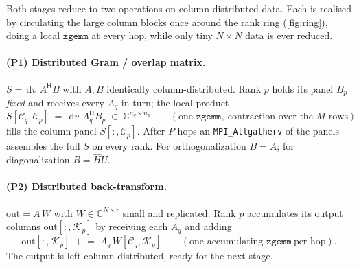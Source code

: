 \documentclass[11pt]{article}
\newcommand{\dv}{\,\mathrm{d}v\,}
\newcommand{\Herm}{^{\mathsf{H}}}
\begin{document}
Both stages reduce to two operations on column-distributed data. Each is
realised by circulating the large column blocks once around the rank ring
(\autoref{fig:ring}), doing a local $\mathtt{zgemm}$ at every hop, while only
tiny $N\!\times\!N$ data is ever reduced.

\paragraph{(P1) Distributed Gram / overlap matrix.}
$S=\dv\,A\Herm B$ with $A,B$ identically column-distributed. Rank $p$ holds its
panel $B_p$ \emph{fixed} and receives every $A_q$ in turn; the local product
\begin{equation}
  S[\mathcal{C}_q,\mathcal{C}_p] \;=\; \dv\,A_q\Herm B_p \;\in\;\mathbb{C}^{n_q\times n_p}
  \qquad(\text{one }\mathtt{zgemm},\ \text{contraction over the }M\text{ rows})
  \label{eq:panel}
\end{equation}
fills the column panel $S[:,\mathcal{C}_p]$. After $P$ hops an
\texttt{MPI\_Allgatherv} of the panels assembles the full $S$ on every rank.
For orthogonalization $B=A$; for diagonalization $B=\hat H U$.

\paragraph{(P2) Distributed back-transform.}
$\mathrm{out}=A\,W$ with $W\in\mathbb{C}^{N\times r}$ small and replicated. Rank
$p$ accumulates its output columns $\mathrm{out}[:,\mathcal{K}_p]$ by receiving
each $A_q$ and adding
\begin{equation}
  \mathrm{out}[:,\mathcal{K}_p] \;\mathrel{+}=\; A_q\, W[\mathcal{C}_q,\mathcal{K}_p]
  \qquad(\text{one accumulating }\mathtt{zgemm}\ \text{per hop}).
  \label{eq:back}
\end{equation}
The output is left column-distributed, ready for the next stage.
\end{document}

